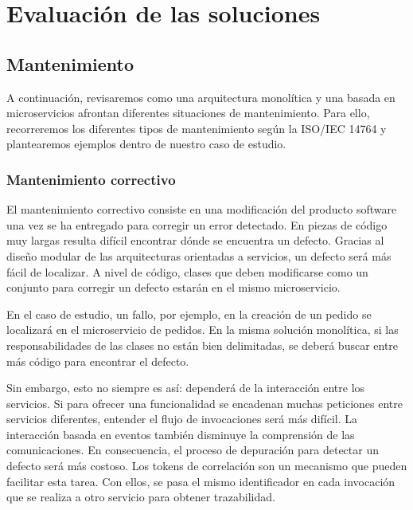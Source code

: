 \documentclass[11pt,spanish,listoffigures]{tfgetsinf}
\begin{document}
%

\chapter{Evaluación de las soluciones}

\section{Mantenimiento} \label{sect:Mantenimiento}

A continuación, revisaremos como una arquitectura monolítica y una basada en microservicios afrontan diferentes situaciones de mantenimiento. Para ello, recorreremos los diferentes tipos de mantenimiento según la ISO/IEC 14764 y plantearemos ejemplos dentro de nuestro caso de estudio. 

\subsection{Mantenimiento correctivo}

El mantenimiento correctivo consiste en una modificación del producto software una vez se ha entregado para corregir un error detectado. \cite{Bourque2014} En piezas de código muy largas resulta difícil encontrar dónde se encuentra un defecto. Gracias al diseño modular de las arquitecturas orientadas a servicios, un defecto será más fácil de localizar. A nivel de código, clases que deben modificarse como un conjunto para corregir un defecto estarán en el mismo microservicio.

En el caso de estudio, un fallo, por ejemplo, en la creación de un pedido se localizará en el microservicio de pedidos. En la misma solución monolítica, si las responsabilidades de las clases no están bien delimitadas, se deberá buscar entre más código para encontrar el defecto.

Sin embargo, esto no siempre es así: dependerá de la interacción entre los servicios. Si para ofrecer una funcionalidad se encadenan muchas peticiones entre servicios diferentes, entender el flujo de invocaciones será más difícil. La interacción basada en eventos también disminuye la comprensión de las comunicaciones. En consecuencia, el proceso de depuración para detectar un defecto será más costoso. Los tokens de correlación son un mecanismo que pueden facilitar esta tarea. Con ellos, se pasa el mismo identificador en cada invocación que se realiza a otro servicio para obtener trazabilidad. \cite{Baum2016}
\end{document}

